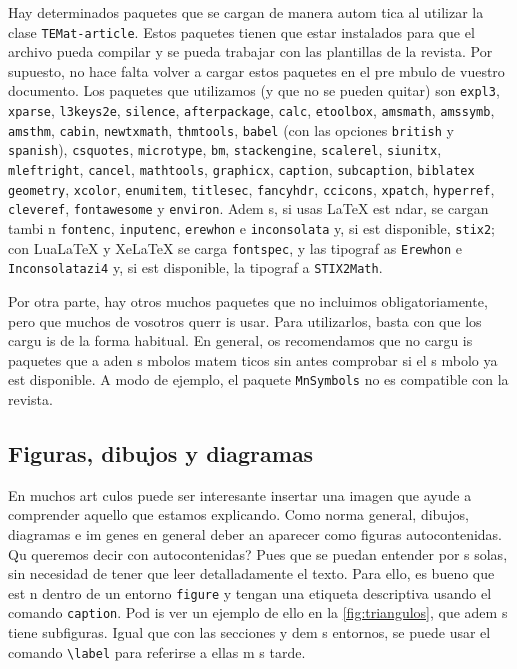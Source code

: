 \documentclass{article}
\begin{document}
Hay determinados paquetes que se cargan de manera autom tica al utilizar la clase \verb+TEMat-article+.
Estos paquetes tienen que estar instalados para que el archivo pueda compilar y se pueda trabajar con las plantillas de la revista.
Por supuesto, no hace falta volver a cargar estos paquetes en el pre mbulo de vuestro documento.
Los paquetes que utilizamos (y que no se pueden quitar) son \verb+expl3+, \verb+xparse+, \verb+l3keys2e+, \verb+silence+, \verb+afterpackage+, \verb+calc+, \verb+etoolbox+, \verb+amsmath+, \verb+amssymb+, \verb+amsthm+, \verb+cabin+, \verb+newtxmath+,  \verb+thmtools+, \verb+babel+ (con las opciones \verb+british+ y \verb+spanish+), \verb+csquotes+, \verb+microtype+, \verb+bm+, \verb+stackengine+, \verb+scalerel+, \verb+siunitx+, \verb+mleftright+, \verb+cancel+, \verb+mathtools+, \verb+graphicx+, \verb+caption+, \verb+subcaption+, \verb+biblatex+ \verb+geometry+, \verb+xcolor+, \verb+enumitem+, \verb+titlesec+, \verb+fancyhdr+, \verb+ccicons+, \verb+xpatch+, \verb+hyperref+, \verb+cleveref+, \verb+fontawesome+ y \verb+environ+.
Adem s, si usas LaTeX est ndar, se cargan tambi n \verb+fontenc+, \verb+inputenc+, \verb+erewhon+ e \verb+inconsolata+ y, si est  disponible, \verb+stix2+; con LuaLaTeX y XeLaTeX se carga \verb+fontspec+, y las tipograf as \verb+Erewhon+ e \verb+Inconsolatazi4+  y, si est  disponible, la tipograf a \verb+STIX2Math+.

Por otra parte, hay otros muchos paquetes que no incluimos obligatoriamente, pero que muchos de vosotros querr is usar.
Para utilizarlos, basta con que los cargu is de la forma habitual.
En general, os recomendamos que no cargu is paquetes que a aden s mbolos matem ticos sin antes comprobar si el s mbolo ya est  disponible.
A modo de ejemplo, el paquete \verb+MnSymbols+ no es compatible con la revista.

\subsection{Figuras, dibujos y diagramas}\label{sec:diagramas}
En muchos art culos puede ser interesante insertar una imagen que ayude a comprender aquello que estamos explicando.
Como norma general, dibujos, diagramas e im genes en general deber an aparecer como figuras autocontenidas.
 Qu  queremos decir con autocontenidas?
Pues que se puedan entender por s  solas, sin necesidad de tener que leer detalladamente el texto.
Para ello, es bueno que est n dentro de un entorno \verb+figure+ y tengan una etiqueta descriptiva usando el comando \verb+caption+.
Pod is ver un ejemplo de ello en la \cref{fig:triangulos}, que adem s tiene subfiguras.
Igual que con las secciones y dem s entornos, se puede usar el comando \verb+\label+ para referirse a ellas m s tarde.
\end{document}
